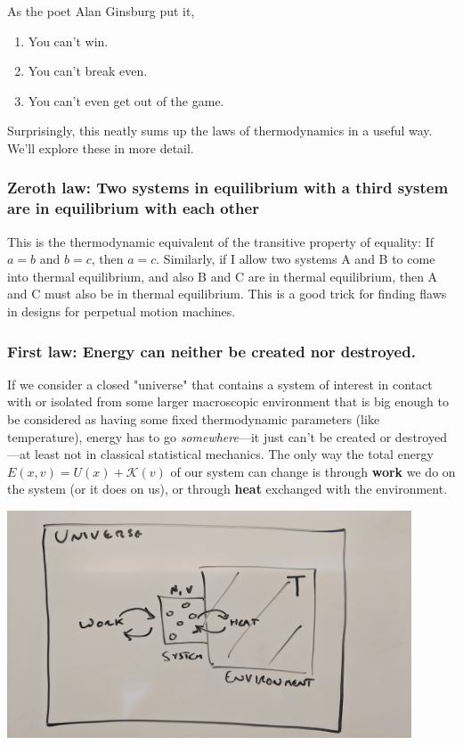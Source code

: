 \documentclass[english,course]{lecture}
\begin{document}
As the poet Alan Ginsburg put it, 
\begin{enumerate}
\item You can't win.
\item You can't break even.
\item You can't even get out of the game.
\end{enumerate}
Surprisingly, this neatly sums up the laws of thermodynamics in a useful way.
We'll explore these in more detail.

\subsubsection{Zeroth law: Two systems in equilibrium with a third system are in equilibrium with each other}

This is the thermodynamic equivalent of the transitive property of equality: If $a = b$ and $b = c$, then $a = c$.
Similarly, if I allow two systems A and B to come into thermal equilibrium, and also B and C are in thermal equilibrium, then A and C must also be in thermal equilibrium.
This is a good trick for finding flaws in designs for perpetual motion machines.

\subsubsection{First law: Energy can neither be created nor destroyed.}

If we consider a closed "universe" that contains a system of interest in contact with or isolated from some larger macroscopic environment that is big enough to be considered as having some fixed thermodynamic parameters (like temperature), energy has to go \emph{somewhere}---it just can't be created or destroyed---at least not in classical statistical mechanics.
The only way the total energy $E(x,v) = U(x) + \mathcal{K}(v)$ of our system can change is through {\bf work} we do on the system (or it does on us), or through {\bf heat} exchanged with the environment.

\begin{centering}
\includegraphics[width=0.9\textwidth]{figures/universe.jpg}

\end{centering}
\end{document}

